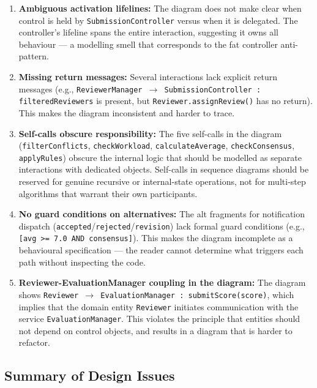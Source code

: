 \documentclass[12pt, a4paper]{article}
\begin{document}
\begin{enumerate}[nosep]
    \item \textbf{Ambiguous activation lifelines:} The diagram does not make clear when control is held by \texttt{SubmissionController} versus when it is delegated. The controller's lifeline spans the entire interaction, suggesting it owns all behaviour --- a modelling smell that corresponds to the fat controller anti-pattern.

    \item \textbf{Missing return messages:} Several interactions lack explicit return messages (e.g., \texttt{ReviewerManager $\rightarrow$ SubmissionController : filteredReviewers} is present, but \texttt{Reviewer.assignReview()} has no return). This makes the diagram inconsistent and harder to trace.

    \item \textbf{Self-calls obscure responsibility:} The five self-calls in the diagram (\texttt{filterConflicts}, \texttt{checkWorkload}, \texttt{calculateAverage}, \texttt{checkConsensus}, \texttt{applyRules}) obscure the internal logic that should be modelled as separate interactions with dedicated objects. Self-calls in sequence diagrams should be reserved for genuine recursive or internal-state operations, not for multi-step algorithms that warrant their own participants.

    \item \textbf{No guard conditions on alternatives:} The alt fragments for notification dispatch (\texttt{accepted}/\texttt{rejected}/\texttt{revision}) lack formal guard conditions (e.g., \texttt{[avg >= 7.0 AND consensus]}). This makes the diagram incomplete as a behavioural specification --- the reader cannot determine what triggers each path without inspecting the code.

    \item \textbf{Reviewer-EvaluationManager coupling in the diagram:} The diagram shows \texttt{Reviewer $\rightarrow$ EvaluationManager : submitScore(score)}, which implies that the domain entity \texttt{Reviewer} initiates communication with the service \texttt{EvaluationManager}. This violates the principle that entities should not depend on control objects, and results in a diagram that is harder to refactor.
\end{enumerate}

\subsection{Summary of Design Issues}
\end{document}
